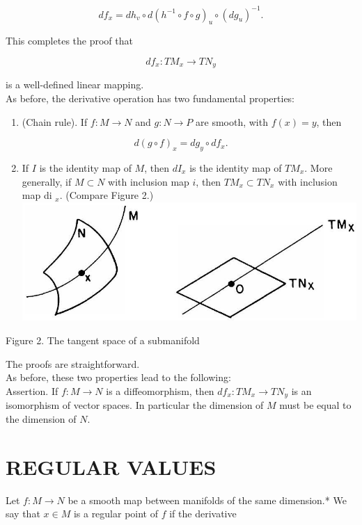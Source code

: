 \documentclass[10pt, letterpaper]{article}
\begin{document}
$$
d f_{x}=d h_{v} \circ d\left(h^{-1} \circ f \circ g\right)_{u} \circ\left(d g_{u}\right)^{-1} .
$$

This completes the proof that

$$
d f_{x}: T M_{x} \rightarrow T N_{y}
$$

is a well-defined linear mapping.\\
As before, the derivative operation has two fundamental properties:

\begin{enumerate}
  \item (Chain rule). If $f: M \rightarrow N$ and $g: N \rightarrow P$ are smooth, with $f(x)=y$, then
\end{enumerate}

$$
d(g \circ f)_{x}=d g_{y} \circ d f_{x} .
$$

\begin{enumerate}
  \setcounter{enumi}{1}
  \item If $I$ is the identity map of $M$, then $d I_{x}$ is the identity map of $T M_{x}$. More generally, if $M \subset N$ with inclusion map $i$, then $T M_{x} \subset T N_{x}$ with inclusion map di ${ }_{x}$. (Compare Figure 2.)\\
\includegraphics[scale=0.2, center]{2025_05_28_7c9927389b272ddbc2c3g-18}
\end{enumerate}

Figure 2. The tangent space of a submanifold

The proofs are straightforward.\\
As before, these two properties lead to the following:\\
Assertion. If $f: M \rightarrow N$ is a diffeomorphism, then $d f_{x}: T M_{x} \rightarrow T N_{y}$ is an isomorphism of vector spaces. In particular the dimension of $M$ must be equal to the dimension of $N$.

\section*{REGULAR VALUES}
Let $f: M \rightarrow N$ be a smooth map between manifolds of the same dimension.* We say that $x \in M$ is a regular point of $f$ if the derivative
\end{document}
